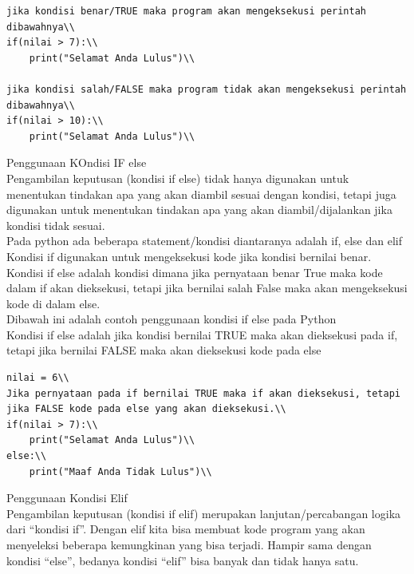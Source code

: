 \begin{enumerate}
\begin{enumerate}
\begin{verbatim}
jika kondisi benar/TRUE maka program akan mengeksekusi perintah dibawahnya\\
if(nilai > 7):\\
    print("Selamat Anda Lulus")\\

jika kondisi salah/FALSE maka program tidak akan mengeksekusi perintah dibawahnya\\
if(nilai > 10):\\
    print("Selamat Anda Lulus")\\
\end{verbatim}

Penggunaan KOndisi IF else\\

Pengambilan keputusan (kondisi if else) tidak hanya digunakan untuk menentukan tindakan apa yang akan diambil sesuai dengan kondisi, tetapi juga digunakan untuk menentukan tindakan apa yang akan diambil/dijalankan jika kondisi tidak sesuai.
\\
Pada python ada beberapa statement/kondisi diantaranya adalah if, else dan elif Kondisi if digunakan untuk mengeksekusi kode jika kondisi bernilai benar.
\\
Kondisi if else adalah kondisi dimana jika pernyataan benar True maka kode dalam if akan dieksekusi, tetapi jika bernilai salah False maka akan mengeksekusi kode di dalam else.
\\
Dibawah ini adalah contoh penggunaan kondisi if else pada Python
\\

Kondisi if else adalah jika kondisi bernilai TRUE maka akan dieksekusi pada if, tetapi jika bernilai FALSE maka akan dieksekusi kode pada else\\
\begin{verbatim}
nilai = 6\\
Jika pernyataan pada if bernilai TRUE maka if akan dieksekusi, tetapi jika FALSE kode pada else yang akan dieksekusi.\\
if(nilai > 7):\\
    print("Selamat Anda Lulus")\\
else:\\
    print("Maaf Anda Tidak Lulus")\\

\end{verbatim}


Penggunaan Kondisi Elif \\
Pengambilan keputusan (kondisi if elif) merupakan lanjutan/percabangan logika dari “kondisi if”. Dengan elif kita bisa membuat kode program yang akan menyeleksi beberapa kemungkinan yang bisa terjadi. Hampir sama dengan kondisi “else”, bedanya kondisi “elif” bisa banyak dan tidak hanya satu.\\


\end{enumerate}
\end{enumerate}
